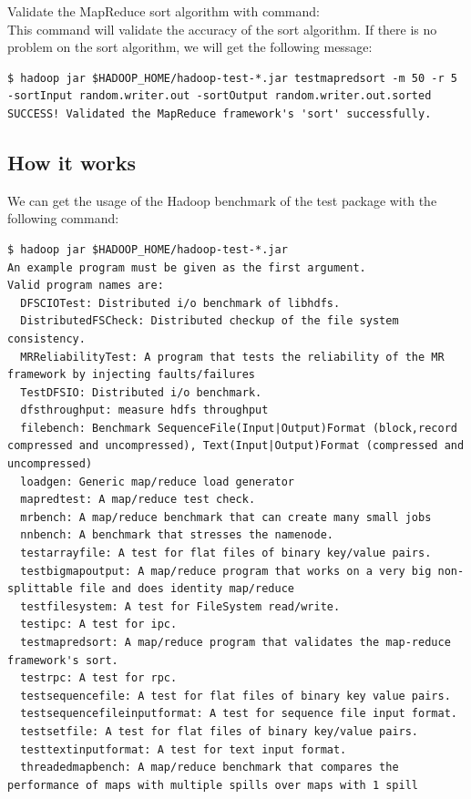 Validate the MapReduce sort algorithm with command: \\
This command will validate the accuracy of the sort algorithm. If there is no problem on the sort algorithm, we will get the following message:
\lstset{style=bashstyle}
\begin{lstlisting}
$ hadoop jar $HADOOP_HOME/hadoop-test-*.jar testmapredsort -m 50 -r 5 -sortInput random.writer.out -sortOutput random.writer.out.sorted
SUCCESS! Validated the MapReduce framework's 'sort' successfully.
\end{lstlisting}

\subsection*{How it works}
We can get the usage of the Hadoop benchmark of the test package with the following command:
\lstset{style=bashstyle}
\begin{lstlisting}
$ hadoop jar $HADOOP_HOME/hadoop-test-*.jar
An example program must be given as the first argument.
Valid program names are:
  DFSCIOTest: Distributed i/o benchmark of libhdfs.
  DistributedFSCheck: Distributed checkup of the file system consistency.
  MRReliabilityTest: A program that tests the reliability of the MR framework by injecting faults/failures
  TestDFSIO: Distributed i/o benchmark.
  dfsthroughput: measure hdfs throughput
  filebench: Benchmark SequenceFile(Input|Output)Format (block,record compressed and uncompressed), Text(Input|Output)Format (compressed and uncompressed)
  loadgen: Generic map/reduce load generator
  mapredtest: A map/reduce test check.
  mrbench: A map/reduce benchmark that can create many small jobs
  nnbench: A benchmark that stresses the namenode.
  testarrayfile: A test for flat files of binary key/value pairs.
  testbigmapoutput: A map/reduce program that works on a very big non-splittable file and does identity map/reduce
  testfilesystem: A test for FileSystem read/write.
  testipc: A test for ipc.
  testmapredsort: A map/reduce program that validates the map-reduce framework's sort.
  testrpc: A test for rpc.
  testsequencefile: A test for flat files of binary key value pairs.
  testsequencefileinputformat: A test for sequence file input format.
  testsetfile: A test for flat files of binary key/value pairs.
  testtextinputformat: A test for text input format.
  threadedmapbench: A map/reduce benchmark that compares the performance of maps with multiple spills over maps with 1 spill
\end{lstlisting}

